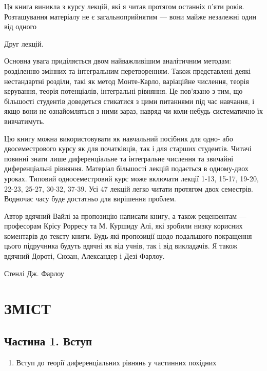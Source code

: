 \documentclass[
  ukrainian,
]{article}
\providecommand{\tightlist}{%
  \setlength{\itemsep}{0pt}\setlength{\parskip}{0pt}}
\begin{document}
Ця книга виникла з курсу лекцій, які я читав протягом останніх п'яти
років. Розташування матеріалу не є загальноприйнятим --- вони майже
незалежні один від одного

Друг лекцій.

Основна увага приділяється двом найважливішим аналітичним методам:
розділенню змінних та інтегральним перетворенням. Також представлені
деякі нестандартні розділи, такі як метод Монте-Карло, варіаційне
числення, теорія керування, теорія потенціалів, інтегральні рівняння. Це
пов'язано з тим, що більшості студентів доведеться стикатися з цими
питаннями під час навчання, і якщо вони не ознайомляться з ними зараз,
навряд чи коли-небудь систематично їх вивчатимуть.

Цю книгу можна використовувати як навчальний посібник для одно- або
двосеместрового курсу як для початківців, так і для старших студентів.
Читачі повинні знати лише диференціальне та інтегральне числення та
звичайні диференціальні рівняння. Матеріал більшості лекцій подається в
одному-двох уроках. Типовий односеместровий курс може включати лекції
1-13, 15-17, 19-20, 22-23, 25-27, 30-32, 37-39. Усі 47 лекцій легко
читати протягом двох семестрів. Водночас часу буде достатньо для
вирішення проблем.

Автор вдячний Вайлі за пропозицію написати книгу, а також рецензентам
--- професорам Крісу Рорресу та М. Куршиду Алі, які зробили низку
корисних коментарів до тексту книги. Будь-які пропозиції щодо подальшого
покращення цього підручника будуть вдячні як від учнів, так і від
викладачів. Я також вдячний Дороті, Сюзан, Александер і Дезі Фарлоу.

Стенлі Дж. Фарлоу

\section{ЗМІСТ}\label{ux437ux43cux456ux441ux442}

\subsection{Частина 1.
Вступ}\label{ux447ux430ux441ux442ux438ux43dux430-1.-ux432ux441ux442ux443ux43f}

\begin{enumerate}
\def\labelenumi{\arabic{enumi}.}
\tightlist
\item
  Вступ до теорії диференціальних рівнянь у частинних похідних
\end{enumerate}
\end{document}
